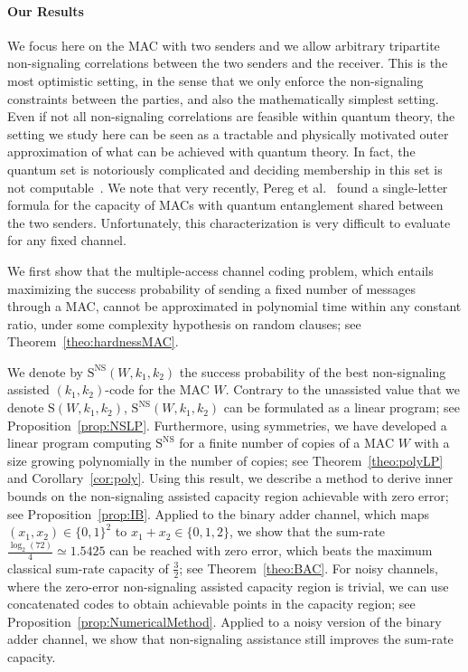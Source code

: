 \paragraph{Our Results} We focus here on the MAC with two senders and we allow arbitrary tripartite non-signaling correlations between the two senders and the receiver. This is the most optimistic setting, in the sense that we only enforce the non-signaling constraints between the parties, and also the mathematically simplest setting. Even if not all non-signaling correlations are feasible within quantum theory, the setting we study here can be seen as a tractable and physically motivated outer approximation of what can be achieved with quantum theory. In fact, the quantum set is notoriously complicated and deciding membership in this set is not computable~\cite{JNWY20}. We note that very recently, Pereg et al.~\cite{PDB23} found a single-letter formula for the capacity of MACs with quantum entanglement shared between the two senders. Unfortunately, this characterization is very difficult to evaluate for any fixed channel.

We first show that the multiple-access channel coding problem, which entails maximizing the success probability of sending a fixed number of messages through a MAC, cannot be approximated in polynomial time within any constant ratio, under some complexity hypothesis on random clauses; see Theorem~\ref{theo:hardnessMAC}.

We denote by $\mathrm{S}^{\mathrm{NS}}(W,k_1,k_2)$ the success probability of the best non-signaling assisted $(k_1,k_2)$-code for the MAC $W$. Contrary to the unassisted value that we denote $\mathrm{S}(W,k_1,k_2)$,  $\mathrm{S}^{\mathrm{NS}}(W,k_1,k_2)$ can be formulated as a linear program; see Proposition~\ref{prop:NSLP}. Furthermore, using symmetries, we have developed a linear program computing $\mathrm{S}^{\mathrm{NS}}$ for a finite number of copies of a MAC $W$ with a size growing polynomially in the number of copies; see Theorem~\ref{theo:polyLP} and Corollary~\ref{cor:poly}. Using this result, we describe a method to derive inner bounds on the non-signaling assisted capacity region achievable with zero error; see Proposition~\ref{prop:IB}. Applied to the binary adder channel, which maps $(x_1, x_2) \in \{0,1\}^2$ to $x_1 + x_2 \in \{0,1,2\}$, we show that the sum-rate $\frac{\log_2(72)}{4} \simeq 1.5425$ can be reached with zero error, which beats the maximum classical sum-rate capacity of $\frac{3}{2}$; see Theorem~\ref{theo:BAC}. For noisy channels, where the zero-error non-signaling assisted capacity region is trivial, we can use concatenated codes to obtain achievable points in the capacity region; see Proposition~\ref{prop:NumericalMethod}. Applied to a noisy version of the binary adder channel, we show that non-signaling assistance still improves the sum-rate capacity. 

